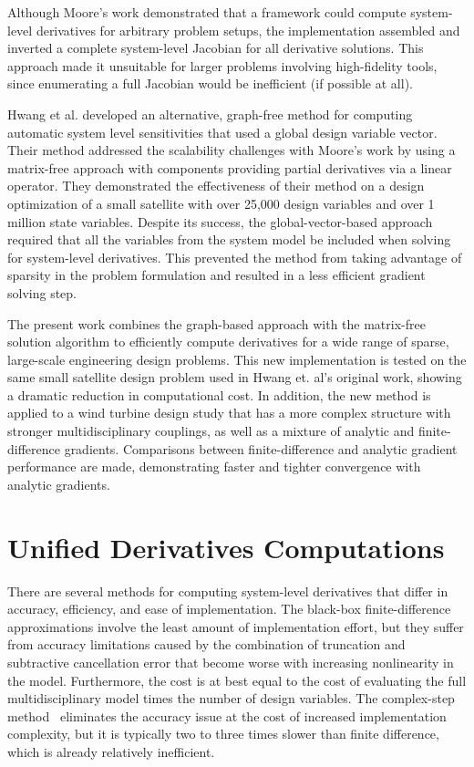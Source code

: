 \documentclass[]{aiaa-tc} %
\begin{document}
    Although Moore's work demonstrated that a framework could compute system-level derivatives for arbitrary
    problem setups, the implementation assembled and inverted a complete system-level Jacobian for
    all derivative solutions.  This approach made it unsuitable for larger problems involving
    high-fidelity tools, since enumerating a full Jacobian would be inefficient (if possible at all).

    Hwang et al.\cite{CADRE2014} developed an alternative, graph-free method for computing automatic system
    level sensitivities that used a global design variable vector. Their method
    addressed the scalability challenges with Moore's work by using a matrix-free approach with
    components providing partial derivatives via a linear operator. They demonstrated the
    effectiveness of their method on a design optimization of a small satellite
    with over 25,000 design variables and over 1 million state variables. Despite its success,
    the global-vector-based approach required that all the variables from the system model be
    included when solving for system-level derivatives. This prevented the method
    from taking advantage of sparsity in the problem formulation and resulted in a less efficient gradient solving step.

    The present work combines the graph-based approach with the matrix-free solution algorithm
    to efficiently compute derivatives for a wide range of sparse, large-scale engineering
    design problems. This new implementation is tested on the same small satellite design problem used in
    Hwang et. al's original work, showing a dramatic reduction in computational cost. In addition,
    the new method is applied to a wind turbine design study that has a more
    complex structure with stronger multidisciplinary couplings, as well as a mixture of
    analytic and finite-difference gradients. Comparisons between finite-difference and analytic gradient
    performance are made, demonstrating faster and tighter convergence with analytic gradients.


  \section{Unified Derivatives Computations}

    There are several methods for computing system-level derivatives that differ in accuracy, efficiency, and ease of implementation.
    The black-box finite-difference approximations involve the least amount of implementation effort, but they suffer from accuracy
    limitations caused by the combination of truncation and subtractive cancellation error that become worse with increasing nonlinearity in the model.
    Furthermore, the cost is at best equal to the cost of evaluating the full multidisciplinary model times the number of design variables.
    The complex-step method~\cite{Martins:2003:CSD} eliminates the accuracy issue at the cost of increased implementation complexity, but it is typically
    two to three times slower than finite difference, which is already relatively inefficient.
\end{document}
